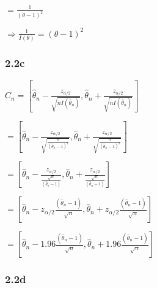 \documentclass[
]{article}
\begin{document}
\(= \frac{1}{(\theta-1)^2}\)

\(\Longrightarrow \frac{1}{I(\theta)} = (\theta-1)^2\)

\hypertarget{c}{%
\subsubsection{2.2c}\label{c}}

\(C_n = [\hat{\theta}_n - \frac{z_{\alpha/2}}{\sqrt{nI(\hat{\theta}_n)}}, \hat{\theta}_n + \frac{z_{\alpha/2}}{\sqrt{nI(\hat{\theta}_n)}}]\)

\(= [\hat{\theta}_n - \frac{z_{\alpha/2}}{\sqrt{\frac{n}{(\hat{\theta}_n-1)^2}}}, \hat{\theta}_n + \frac{z_{\alpha/2}}{\sqrt{\frac{n}{(\hat{\theta}_n-1)^2}}}]\)

\(= [\hat{\theta}_n - \frac{z_{\alpha/2}}{\frac{\sqrt{n}}{(\hat{\theta}_n-1)}}, \hat{\theta}_n + \frac{z_{\alpha/2}}{\frac{\sqrt{n}}{(\hat{\theta}_n-1)}}]\)

\(= [\hat{\theta}_n - z_{\alpha/2}\frac{(\hat{\theta}_n-1)}{\sqrt{n}}, \hat{\theta}_n + z_{\alpha/2}\frac{(\hat{\theta}_n-1)}{\sqrt{n}}]\)

\(= [\hat{\theta}_n - 1.96\frac{(\hat{\theta}_n-1)}{\sqrt{n}}, \hat{\theta}_n + 1.96\frac{(\hat{\theta}_n-1)}{\sqrt{n}}]\)

\hypertarget{d}{%
\subsubsection{2.2d}\label{d}}
\end{document}
